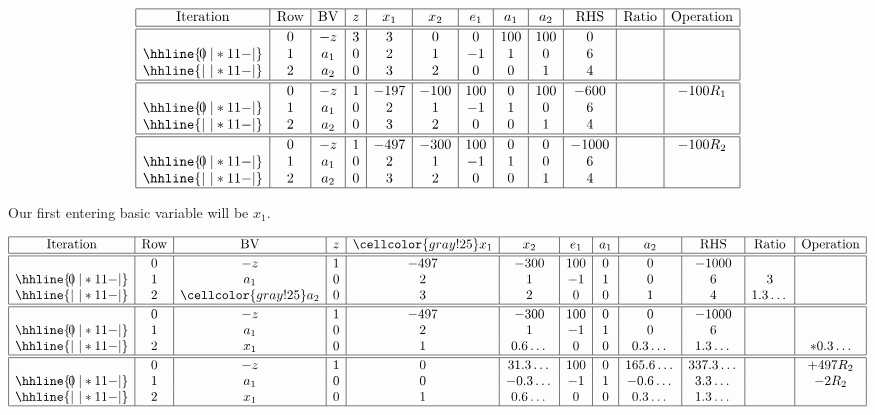 \documentclass[12pt]{article}
\theoremstyle{definition}
\begin{document}
 \[\begin{array}{*{12}{|c}|}
    \hline
    \text{Iteration} & \text{Row} & \text{BV}
        & z & x_1 & x_2 & e_1 & a_1 & a_2
        &\text{RHS} & \text{Ratio} & \text{Operation} \\\hline\hline
    \multirow{3}*{0}
    & 0 & -z  & 3 & 3 & 0 & 0 & 100 & 100 & 0  & & \\\hhline{|~|*{11}{-}|}
    & 1 & a_1 & 0 & 2  & 1  & -1 & 1 & 0 & 6 &  & \\\hhline{|~|*{11}{-}|}
    & 2 & a_2 & 0 & 3  & 2  & 0 & 0 & 1 & 4 &  & \\\hline
    \hline
    \multirow{3}*{0}
    & 0 & -z  & 1 & -197 & -100 & 100 & 0 & 100 & -600  & & -100R_1 \\\hhline{|~|*{11}{-}|}
    & 1 & a_1 & 0 & 2  & 1  & -1 & 1 & 0 & 6 &  & \\\hhline{|~|*{11}{-}|}
    & 2 & a_2 & 0 & 3  & 2  & 0 & 0 & 1 & 4 &  & \\\hline
    \hline
    \multirow{3}*{0}
    & 0 & -z  & 1 & -497 & -300 & 100 & 0 & 0 & -1000  & & -100R_2 \\\hhline{|~|*{11}{-}|}
    & 1 & a_1 & 0 & 2  & 1  & -1 & 1 & 0 & 6 &  & \\\hhline{|~|*{11}{-}|}
    & 2 & a_2 & 0 & 3  & 2  & 0 & 0 & 1 & 4 &  & \\\hline
\end{array}\]

Our first entering basic variable will be $x_1$.

 \[\begin{array}{*{12}{|c}|}
    \hline
    \text{Iteration} & \text{Row} & \text{BV}
        & z & \cellcolor{gray!25}x_1 & x_2 & e_1 & a_1 & a_2
        &\text{RHS} & \text{Ratio} & \text{Operation} \\\hline\hline
    \multirow{3}*{0}
    & 0 & -z  & 1 & -497 & -300 & 100 & 0 & 0 & -1000  & & \\\hhline{|~|*{11}{-}|}
    & 1 & a_1 & 0 & 2  & 1  & -1 & 1 & 0 & 6 & 3 & \\\hhline{|~|*{11}{-}|}
    & 2 & \cellcolor{gray!25}a_2 & 0 & 3  & 2  & 0 & 0 & 1 & 4 & 1.3\dots & \\\hline
    \hline
    \multirow{3}*{0}
    & 0 & -z  & 1 & -497 & -300 & 100 & 0 & 0 & -1000  & & \\\hhline{|~|*{11}{-}|}
    & 1 & a_1 & 0 & 2  & 1  & -1 & 1 & 0 & 6 &  & \\\hhline{|~|*{11}{-}|}
    & 2 & x_1 & 0 & 1  & 0.6\dots  & 0 & 0 & 0.3\dots & 1.3\dots &  & *0.3\dots \\\hline
    \hline
    \multirow{3}*{0}
    & 0 & -z  & 1 & 0 & 31.3\dots & 100 & 0 & 165.6\dots & 337.3\dots & & +497R_2 \\\hhline{|~|*{11}{-}|}
    & 1 & a_1 & 0 & 0  & -0.3\dots  & -1 & 1 & -0.6\dots & 3.3\dots &  & -2R_2 \\\hhline{|~|*{11}{-}|}
    & 2 & x_1 & 0 & 1  & 0.6\dots  & 0 & 0 & 0.3\dots & 1.3\dots &  & \\\hline
\end{array}\]
\end{document}
